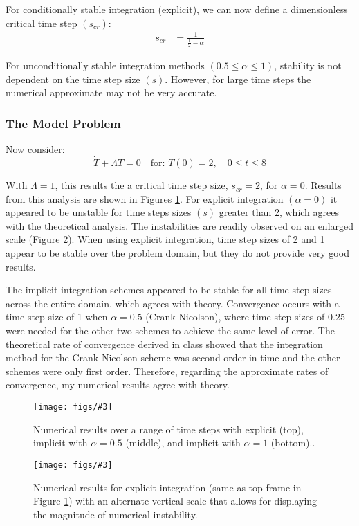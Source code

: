 \documentclass[letterpaper, 10pt, oneside]{article}
\newcommand{\be}{\begin{equation}}
\newcommand{\ee}{\end{equation}}
\newcommand{\an}[1]{\begin{align}#1\end{align}}
\newcommand{\Figure}[4]{
  \begin{figure}[#1]
    \centering
    \texttt{[image: figs/\#3]}
    \caption{#4.}\label{fig:#3}
  \end{figure}}
\begin{document}
For conditionally stable integration (explicit), we can now define a dimensionless critical time step $(\bar{s}_{cr})$:
\an{ \bar{s}_{cr} &= \frac{1}{\frac{1}{2} - \alpha} }

For unconditionally stable integration methods $(0.5 \le \alpha \le 1 )$, stability is not dependent on the time step size $(s)$.  However, for large time steps the numerical approximate may not be very accurate.

\subsubsection{The Model Problem}
Now consider:
	\be \dot{T} + \Lambda T = 0 \quad \text{for: } T(0) = 2, \quad 0 \le t \le 8 \ee

With $\Lambda = 1$, this results the a critical time step size, $s_{cr} = 2$, for $\alpha = 0$.
Results from this analysis are shown in Figures \ref{fig:3a_all.pdf}. For explicit integration $(\alpha = 0)$ it appeared to be unstable for time steps sizes $(s)$ greater than 2, which agrees with the theoretical analysis.  The instabilities are readily observed on an enlarged scale (Figure \ref{fig:3a_1b.pdf}).  When using explicit integration, time step sizes of 2 and 1 appear to be stable over the problem domain, but they do not provide very good results.

The implicit integration schemes appeared to be stable for all time step sizes across the entire domain, which agrees with theory.  Convergence occurs with a time step size of 1 when $\alpha = 0.5$ (Crank-Nicolson), where time step sizes of 0.25 were needed for the other two schemes to achieve the same level of error.  The theoretical rate of convergence derived in class showed that the integration method for the Crank-Nicolson scheme was second-order in time and the other schemes were only first order.  Therefore, regarding the approximate rates of convergence, my numerical results agree with theory.

\Figure{htp}{6.5}{3a_all.pdf}{Numerical results over a range of time steps with explicit (top), implicit with $\alpha=0.5$ (middle), and implicit with $\alpha=1$ (bottom).}

\Figure{htp}{6}{3a_1b.pdf}{Numerical results for explicit integration (same as top frame in Figure \ref{fig:3a_all.pdf}) with an alternate vertical scale that allows for displaying the magnitude of numerical instability}

\newpage
\end{document}
